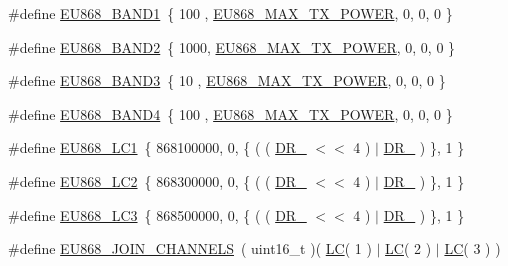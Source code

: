 \begin{DoxyCompactItemize}
\#define \mbox{\hyperlink{group___r_e_g_i_o_n_e_u868_ga8a18e253f46e534ff0ee00c0c21b4211}{E\+U868\+\_\+\+B\+A\+N\+D1}}~\{ 100 , \mbox{\hyperlink{group___r_e_g_i_o_n_e_u868_ga39e338c7f8454f594302811f61d9560d}{E\+U868\+\_\+\+M\+A\+X\+\_\+\+T\+X\+\_\+\+P\+O\+W\+ER}}, 0, 0, 0 \}
\item 
\#define \mbox{\hyperlink{group___r_e_g_i_o_n_e_u868_gaf5b8aba834ede7487acbff80b6c30b36}{E\+U868\+\_\+\+B\+A\+N\+D2}}~\{ 1000, \mbox{\hyperlink{group___r_e_g_i_o_n_e_u868_ga39e338c7f8454f594302811f61d9560d}{E\+U868\+\_\+\+M\+A\+X\+\_\+\+T\+X\+\_\+\+P\+O\+W\+ER}}, 0, 0, 0 \}
\item 
\#define \mbox{\hyperlink{group___r_e_g_i_o_n_e_u868_gab7e01f2131642f135babcd1189d429d3}{E\+U868\+\_\+\+B\+A\+N\+D3}}~\{ 10  , \mbox{\hyperlink{group___r_e_g_i_o_n_e_u868_ga39e338c7f8454f594302811f61d9560d}{E\+U868\+\_\+\+M\+A\+X\+\_\+\+T\+X\+\_\+\+P\+O\+W\+ER}}, 0, 0, 0 \}
\item 
\#define \mbox{\hyperlink{group___r_e_g_i_o_n_e_u868_ga0caf48019c492d018b3442e1975535f4}{E\+U868\+\_\+\+B\+A\+N\+D4}}~\{ 100 , \mbox{\hyperlink{group___r_e_g_i_o_n_e_u868_ga39e338c7f8454f594302811f61d9560d}{E\+U868\+\_\+\+M\+A\+X\+\_\+\+T\+X\+\_\+\+P\+O\+W\+ER}}, 0, 0, 0 \}
\item 
\#define \mbox{\hyperlink{group___r_e_g_i_o_n_e_u868_ga397b82ce41a0eb594465b5728586d76e}{E\+U868\+\_\+\+L\+C1}}~\{ 868100000, 0, \{ ( ( \mbox{\hyperlink{group___r_e_g_i_o_n_ga872e12c82020c02a7f70a1c6ed1375df}{D\+R\+\_}} $<$$<$ 4 ) $\vert$ \mbox{\hyperlink{group___r_e_g_i_o_n_ga6c4ef966b4f3d5eb7597b087f2b97095}{D\+R\+\_}} ) \}, 1 \}
\item 
\#define \mbox{\hyperlink{group___r_e_g_i_o_n_e_u868_ga992597dafaae7a354ae4aeaab6306954}{E\+U868\+\_\+\+L\+C2}}~\{ 868300000, 0, \{ ( ( \mbox{\hyperlink{group___r_e_g_i_o_n_ga872e12c82020c02a7f70a1c6ed1375df}{D\+R\+\_}} $<$$<$ 4 ) $\vert$ \mbox{\hyperlink{group___r_e_g_i_o_n_ga6c4ef966b4f3d5eb7597b087f2b97095}{D\+R\+\_}} ) \}, 1 \}
\item 
\#define \mbox{\hyperlink{group___r_e_g_i_o_n_e_u868_ga6feb4643d2e07e54de83109e680379d2}{E\+U868\+\_\+\+L\+C3}}~\{ 868500000, 0, \{ ( ( \mbox{\hyperlink{group___r_e_g_i_o_n_ga872e12c82020c02a7f70a1c6ed1375df}{D\+R\+\_}} $<$$<$ 4 ) $\vert$ \mbox{\hyperlink{group___r_e_g_i_o_n_ga6c4ef966b4f3d5eb7597b087f2b97095}{D\+R\+\_}} ) \}, 1 \}
\item 
\#define \mbox{\hyperlink{group___r_e_g_i_o_n_e_u868_ga66750d8b2f9ba9f6b8466f190207d53f}{E\+U868\+\_\+\+J\+O\+I\+N\+\_\+\+C\+H\+A\+N\+N\+E\+LS}}~( uint16\+\_\+t )( \mbox{\hyperlink{group___r_e_g_i_o_n_ga12fa17e5c1016e01a9d82c25027deb1b}{LC}}( 1 ) $\vert$ \mbox{\hyperlink{group___r_e_g_i_o_n_ga12fa17e5c1016e01a9d82c25027deb1b}{LC}}( 2 ) $\vert$ \mbox{\hyperlink{group___r_e_g_i_o_n_ga12fa17e5c1016e01a9d82c25027deb1b}{LC}}( 3 ) )
\end{DoxyCompactItemize}

